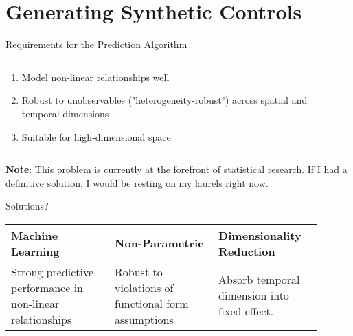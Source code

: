 \section{Generating Synthetic Controls}

\begin{frame}{Requirements for the Prediction Algorithm}
    \begin{columns}
    \begin{column}{0.5\linewidth}
    \vspace{5pt}
      \begin{enumerate}
         \item {Model non-linear relationships well}
         \item {Robust to unobservables ("heterogeneity-robust") across spatial and temporal dimensions}
         \item {Suitable for high-dimensional space}
      \end{enumerate}
    \end{column}
    \begin{column}{0.5\linewidth}
    \end{column}
  \end{columns}

    \begin{center}
    \vspace{5pt}
    \footnotesize{\textbf{Note}: This problem is currently at the forefront of statistical research. If I had a definitive solution, I would be resting on my laurels right now.}
    \end{center}
\end{frame}

\begin{frame}{Solutions?}

    \begin{table}[htbp]
    \centering
    \begin{tabular}{|p{0.3\linewidth}|p{0.3\linewidth}|p{0.3\linewidth}|}
    \hline
    \textbf{Machine Learning} & \textbf{Non-Parametric} & \textbf{Dimensionality Reduction} \\
    \hline
    Strong predictive performance in non-linear relationships & Robust to violations of functional form assumptions & Absorb temporal dimension into fixed effect. \
    \end{tabular}
    \end{table}
\end{frame}

